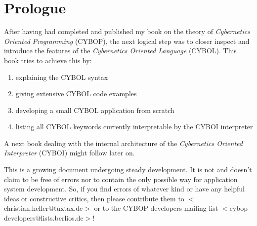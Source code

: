 %
%
%
%
%
%

\section*{Prologue}
\label{prologue_heading}

After having had completed and published my book on the theory of
\emph{Cybernetics Oriented Programming} (CYBOP), the next logical step was to
closer inspect and introduce the features of the
\emph{Cybernetics Oriented Language} (CYBOL). This book tries to achieve this
by:

\begin{enumerate}
    \item explaining the CYBOL syntax
    \item giving extensive CYBOL code examples
    \item developing a small CYBOL application from scratch
    \item listing all CYBOL keywords currently interpretable by the CYBOI interpreter
\end{enumerate}

A next book dealing with the internal architecture of the
\emph{Cybernetics Oriented Interpreter} (CYBOI) might follow later on.

This is a growing document undergoing steady development. It is not and doesn't
claim to be free of errors nor to contain the only possible way for application
system development. So, if you find errors of whatever kind or have any helpful
ideas or constructive critics, then please contribute them to
\(<\)christian.heller@tuxtax.de\(>\) or to the CYBOP developers mailing list
\(<\)cybop-developers@lists.berlios.de\(>\)!
